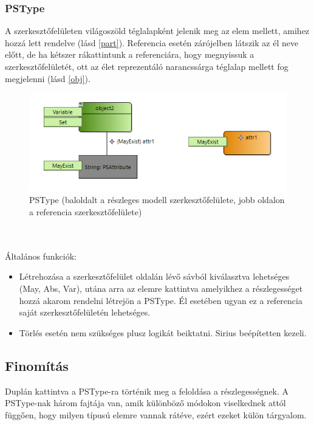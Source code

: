 \subsubsection{PSType}
A szerkesztőfelületen világoszöld téglalapként jelenik meg az elem mellett, amihez hozzá lett rendelve (lásd \autoref{part}). Referencia esetén zárójelben látszik az él neve előtt, de ha kétszer rákattintunk a referenciára, hogy megnyissuk a szerkesztőfelületét, ott az élet reprezentáló narancssárga téglalap mellett fog megjelenni (lásd \autoref{obj}).
\begin{figure}[!ht]
	\centering
	\includegraphics{figures/part.png}
	\caption{PSType (baloldalt a részleges modell szerkesztőfelülete, jobb oldalon a referencia szerkesztőfelülete)}
	\label{part} 
\end{figure}
\\\\
Általános funkciók:
\begin{itemize}  	
	\item Létrehozása a szerkesztőfelület oldalán lévő sávból kiválasztva lehetséges (May, Abs, Var), utána arra az elemre kattintva amelyikhez a részlegességet hozzá akarom rendelni létrejön a PSType. Él esetében ugyan ez a referencia saját szerkesztőfelületén lehetséges.
	
	\item Törlés esetén nem szükséges plusz logikát beiktatni. Sirius  beépítetten kezeli.	
\end{itemize}

\subsection{Finomítás}
Duplán kattintva a PSType-ra történik meg a feloldása a részlegességnek. A PSType-nak három fajtája van, amik különböző módokon viselkednek attól függően, hogy milyen típusú elemre vannak rátéve, ezért ezeket külön tárgyalom. 

